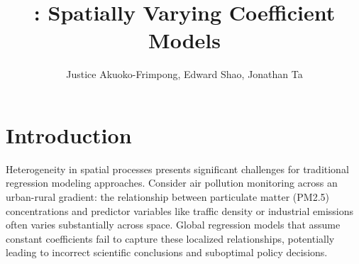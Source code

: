



\addtolength{\oddsidemargin}{-.5in}%
\addtolength{\evensidemargin}{-1in}%
\addtolength{\textwidth}{1in}%
\addtolength{\textheight}{1.7in}%
\addtolength{\topmargin}{-1in}%



\def\spacingset#1{\renewcommand{\baselinestretch}%
{#1}\small\normalsize} \spacingset{1}

\date{}

\newcommand{\footremember}[2]{%
    \footnote{#2}
    \newcounter{#1}
    \setcounter{#1}{\value{footnote}}%
}
\newcommand{\footrecall}[1]{%
    \footnotemark[\value{#1}]%
} 

\newcommand{\bbE}{\mathbb{E}}
\newcommand{\bbR}{\mathbb{R}}
\newcommand{\bX}{\boldsymbol{X}}
\newcommand{\bs}{\boldsymbol{s}}
\newcommand{\bw}{\boldsymbol{w}}
\newcommand{\bc}{\boldsymbol{c}}
\newcommand{\btheta}{\boldsymbol{\theta}}
\newcommand{\wtilde}{\tilde{w}}
\newcommand{\Ytilde}{\tilde{Y}}

\newcommand{\mytitle}{: Spatially Varying Coefficient Models}  

\title{\bf \mytitle}
\author{Justice Akuoko-Frimpong, Edward Shao, Jonathan Ta}

\maketitle


\spacingset{1.9} %
\section{Introduction}
\label{sec:intro}

Heterogeneity in spatial processes presents significant challenges for traditional regression modeling approaches. Consider air pollution monitoring across an urban-rural gradient: the relationship between particulate matter (PM2.5) concentrations and predictor variables like traffic density or industrial emissions often varies substantially across space. Global regression models that assume constant coefficients fail to capture these localized relationships, potentially leading to incorrect scientific conclusions and suboptimal policy decisions.


